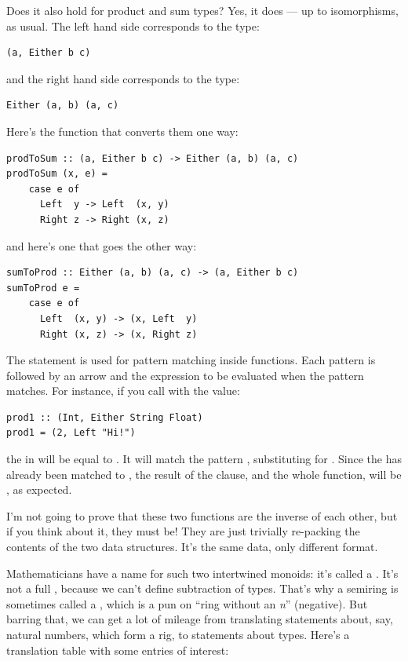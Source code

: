 \noindent
Does it also hold for product and sum types? Yes, it does --- up to
isomorphisms, as usual. The left hand side corresponds to the type:

\begin{verbatim}
(a, Either b c)
\end{verbatim}

\noindent
and the right hand side corresponds to the type:

\begin{verbatim}
Either (a, b) (a, c)
\end{verbatim}

\noindent
Here's the function that converts them one way:

\begin{verbatim}
prodToSum :: (a, Either b c) -> Either (a, b) (a, c)
prodToSum (x, e) = 
    case e of
      Left  y -> Left  (x, y)
      Right z -> Right (x, z)
\end{verbatim}

\noindent
and here's one that goes the other way:

\begin{verbatim}
sumToProd :: Either (a, b) (a, c) -> (a, Either b c)
sumToProd e =
    case e of
      Left  (x, y) -> (x, Left  y)
      Right (x, z) -> (x, Right z)
\end{verbatim}

\noindent
The  statement is used for pattern matching inside
functions. Each pattern is followed by an arrow and the expression to be
evaluated when the pattern matches. For instance, if you call
 with the value:

\begin{verbatim}
prod1 :: (Int, Either String Float)
prod1 = (2, Left "Hi!")
\end{verbatim}

\noindent
the  in  will be equal to
. It will match the pattern ,
substituting  for . Since the  has
already been matched to , the result of the 
clause, and the whole function, will be , as
expected.

I'm not going to prove that these two functions are the inverse of each
other, but if you think about it, they must be! They are just trivially
re-packing the contents of the two data structures. It's the same data,
only different format.

Mathematicians have a name for such two intertwined monoids: it's called
a . It's not a full , because we can't define
subtraction of types. That's why a semiring is sometimes called a
, which is a pun on ``ring without an \emph{n}'' (negative).
But barring that, we can get a lot of mileage from translating
statements about, say, natural numbers, which form a rig, to statements
about types. Here's a translation table with some entries of interest:

